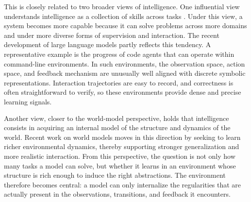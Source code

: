 This is closely related to two broader views of intelligence. One influential view understands intelligence as a collection of skills across tasks \citep{chollet2019measure}. Under this view, a system becomes more capable because it can solve problems across more domains and under more diverse forms of supervision and interaction. The recent development of large language models partly reflects this tendency. A representative example is the progress of code agents that can operate within command-line environments. In such environments, the observation space, action space, and feedback mechanism are unusually well aligned with discrete symbolic representations. Interaction trajectories are easy to record, and correctness is often straightforward to verify, so these environments provide dense and precise learning signals.

Another view, closer to the world-model perspective, holds that intelligence consists in acquiring an internal model of the structure and dynamics of the world. Recent work on world models \citep{tu2025playerone} moves in this direction by seeking to learn richer environmental dynamics, thereby supporting stronger generalization and more realistic interaction. From this perspective, the question is not only how many tasks a model can solve, but whether it learns in an environment whose structure is rich enough to induce the right abstractions. The environment therefore becomes central: a model can only internalize the regularities that are actually present in the observations, transitions, and feedback it encounters.

